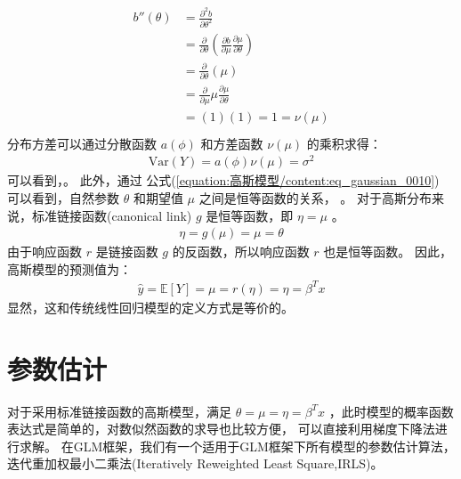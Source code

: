 \documentclass[letterpaper,10pt,english]{sphinxmanual}
\begin{document}
\begin{align}\label{equation:高斯模型/content:高斯模型/content:3}\!\begin{aligned}
b''(\theta) &= \frac{\partial^2 b}{\partial \theta^2}\\
&= \frac{\partial }{\partial \theta} \left ( \frac{\partial b}{\partial \mu} \frac{\partial \mu}{\partial \theta} \right )\\
&= \frac{\partial }{\partial \theta}(\mu)\\
&= \frac{\partial }{\partial \mu} \mu \frac{\partial \mu}{\partial \theta}\\
&= (1)(1)=1 = \nu(\mu)\\
\end{aligned}\end{align}
分布方差可以通过分散函数 \(a(\phi)\) 和方差函数 \(\nu(\mu)\) 的乘积求得：
\begin{equation}\label{equation:高斯模型/content:高斯模型/content:4}
\begin{split}\mathrm{Var}(Y)=  a(\phi) \nu(\mu) = \sigma^2\end{split}
\end{equation}
可以看到，。
此外，通过 公式(\ref{equation:高斯模型/content:eq_gaussian_0010}) 可以看到，自然参数 \(\theta\) 和期望值 \(\mu\) 之间是恒等函数的关系，
 。
对于高斯分布来说，标准链接函数(canonical link) \(g\) 是恒等函数，即 \(\eta=\mu\) 。
\begin{equation}\label{equation:高斯模型/content:高斯模型/content:5}
\begin{split}\eta=g(\mu)=\mu=\theta\end{split}
\end{equation}
由于响应函数 \(r\) 是链接函数 \(g\) 的反函数，所以响应函数 \(r\) 也是恒等函数。
因此，高斯模型的预测值为：
\begin{equation}\label{equation:高斯模型/content:高斯模型/content:6}
\begin{split}\hat{y} = \mathbb{E}[Y] = \mu=r(\eta)=\eta =\beta^Tx\end{split}
\end{equation}
显然，这和传统线性回归模型的定义方式是等价的。


\section{参数估计}
\label{\detokenize{_u9ad8_u65af_u6a21_u578b/content:id5}}
对于采用标准链接函数的高斯模型，满足 \(\theta=\mu=\eta=\beta^T x\)
，此时模型的概率函数表达式是简单的，对数似然函数的求导也比较方便，
可以直接利用梯度下降法进行求解。
在GLM框架，我们有一个适用于GLM框架下所有模型的参数估计算法，
迭代重加权最小二乘法(Iteratively Reweighted Least Square,IRLS)。
\end{document}
